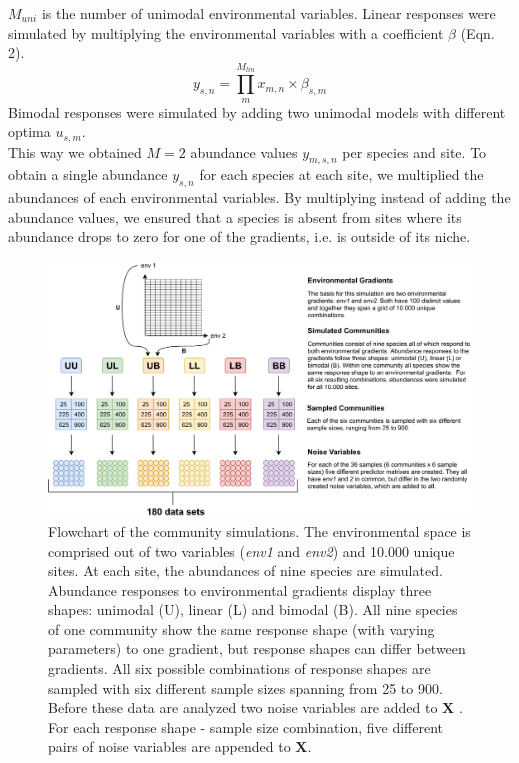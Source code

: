 \documentclass[a4paper,11pt]{article}
\begin{document}
		$M_{uni}$ is the number of unimodal environmental variables. 
		Linear responses were simulated by multiplying the environmental variables with a coefficient $\beta$ (Eqn. 2).
		\begin{equation}
		 				y_{s,n} = \prod_{m}^{M_{lin}} x_{m,n} \times \beta_{s,m}
		\end{equation}
		Bimodal responses were simulated by adding two unimodal models with different optima $u_{s,m}$.\\
		This way we obtained $M = 2$ abundance values $y_{m,s,n}$ per species and site. 
		To obtain a single abundance $y_{s,n}$ for each species at each site, we multiplied the abundances of each environmental variables.
		By multiplying instead of adding the abundance values, we ensured that a species is absent from sites where its abundance drops to zero for one of the gradients, i.e. is outside of its niche. 

		
		\begin{figure}[ht]
			\centering
			\includegraphics[width=1\linewidth]{manuscript/figure2_flowchart}
			\caption{
			        Flowchart of the community simulations. 
			        The environmental space is comprised out of two variables (\textit{env1} and \textit{env2}) and 10.000 unique sites.
			        At each site, the abundances of nine species are simulated. 
			        Abundance responses to environmental gradients display three shapes:
			        unimodal (U), linear (L) and bimodal (B). 
			         All nine species of one community show the same response shape (with varying parameters) to one gradient, but response shapes can differ between gradients. 
			         All six possible combinations of response shapes are sampled with six different sample sizes spanning from 25 to 900.
                    Before these data are analyzed two noise variables are added to $\mathbf{X}$ .
                    For each response shape - sample size combination, five different pairs of noise variables are appended to $\mathbf{X}$. 
			        }
			\label{fig:flowchart_simulation}
		\end{figure}
	
\end{document}
